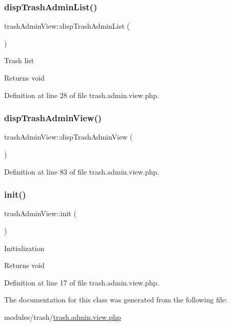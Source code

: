 \subsubsection{\texorpdfstring{disp\+Trash\+Admin\+List()}{dispTrashAdminList()}}
{\footnotesize\ttfamily trash\+Admin\+View\+::disp\+Trash\+Admin\+List (\begin{DoxyParamCaption}{ }\end{DoxyParamCaption})}

Trash list \begin{DoxyReturn}{Returns}
void 
\end{DoxyReturn}


Definition at line 28 of file trash.\+admin.\+view.\+php.

\mbox{\label{classtrashAdminView_a77a13f0633df48ee6802c706d8ccf1de}} 
\subsubsection{\texorpdfstring{disp\+Trash\+Admin\+View()}{dispTrashAdminView()}}
{\footnotesize\ttfamily trash\+Admin\+View\+::disp\+Trash\+Admin\+View (\begin{DoxyParamCaption}{ }\end{DoxyParamCaption})}



Definition at line 83 of file trash.\+admin.\+view.\+php.

\mbox{\label{classtrashAdminView_a471722f4a946b3eff0992c48f268d7eb}} 
\subsubsection{\texorpdfstring{init()}{init()}}
{\footnotesize\ttfamily trash\+Admin\+View\+::init (\begin{DoxyParamCaption}{ }\end{DoxyParamCaption})}

Initialization \begin{DoxyReturn}{Returns}
void 
\end{DoxyReturn}


Definition at line 17 of file trash.\+admin.\+view.\+php.



The documentation for this class was generated from the following file\+:\begin{DoxyCompactItemize}
\item 
modules/trash/\hyperlink{trash_8admin_8view_8php}{trash.\+admin.\+view.\+php}\end{DoxyCompactItemize}
